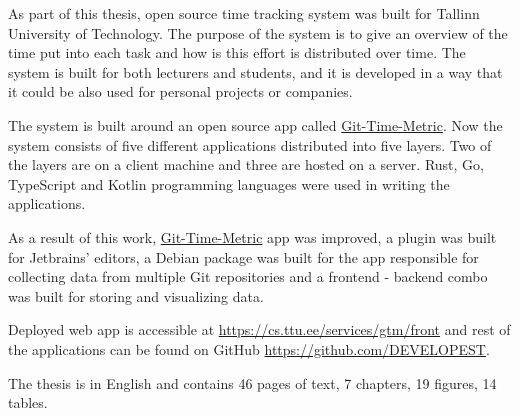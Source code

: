 As part of this thesis, open source time tracking system was built for Tallinn University of Technology.
The purpose of the system is to give an overview of the time put into each task and how is
this effort is distributed over time.
The system is built for both lecturers and students, and it is developed in a way that it
could be also used for personal projects or companies.

The system is built around an open source app called \href{https://github.com/git-time-metric/gtm}{Git-Time-Metric}.
Now the system consists of five different applications distributed into five layers.
Two of the layers are on a client machine and three are hosted on a server.
Rust, Go, TypeScript and Kotlin programming languages were used in writing the applications.

As a result of this work, \href{https://github.com/git-time-metric/gtm}{Git-Time-Metric} app was improved,
a plugin was built for Jetbrains' editors,
a Debian package was built for the app responsible for collecting data from multiple Git repositories
and a frontend - backend combo was built for storing and visualizing data.

Deployed web app is accessible at \href{https://cs.ttu.ee/services/gtm/front}{https://cs.ttu.ee/services/gtm/front}
and rest of the applications can be found on GitHub \href{https://github.com/DEVELOPEST}{https://github.com/DEVELOPEST}.

The thesis is in English and contains 46 pages of text, 7 chapters, 19 figures, 14 tables.
